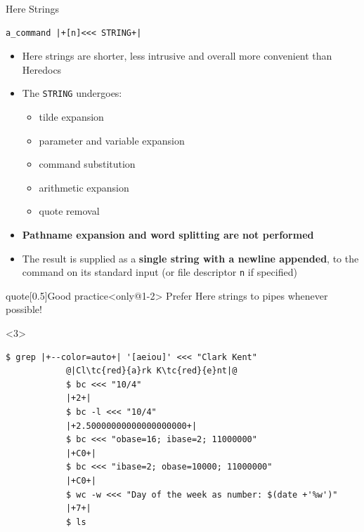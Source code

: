 \begin{frame}[fragile]{Here Strings}
    \begin{lstlisting}[style=MyBash, numbers=none]
        a_command |+[n]<<< STRING+|
    \end{lstlisting}
    \vspace{3mm}
    \begin{itemize}[<only@1-2>]
        \item Here strings are shorter, less intrusive and overall more convenient than Heredocs\\[-0.5ex]
        \item The \texttt{STRING} undergoes:
              \begin{itemize}
                  \item tilde expansion
                  \item parameter and variable expansion
                  \item command substitution
                  \item arithmetic expansion
                  \item quote removal
              \end{itemize}
        \item \textbf{Pathname expansion and word splitting are not performed}
        \item The result is supplied as a \alert{\textbf{single string with a newline appended}}, to the command on its standard input (or file descriptor \texttt{n} if specified)
    \end{itemize}
    \begin{varblock}{quote}[0.5\textwidth]{Good practice}<only@1-2>
        \textnormal{Prefer Here strings to pipes whenever possible!}
    \end{varblock}
    \begin{onlyenv}<3>
        \begin{lstlisting}[style=MyBash, aboveskip=0mm, style=oddnumbers]
            $ grep |+--color=auto+| '[aeiou]' <<< "Clark Kent"
            @|Cl\tc{red}{a}rk K\tc{red}{e}nt|@
            $ bc <<< "10/4"
            |+2+|
            $ bc -l <<< "10/4"
            |+2.50000000000000000000+|
            $ bc <<< "obase=16; ibase=2; 11000000"
            |+C0+|
            $ bc <<< "ibase=2; obase=10000; 11000000"
            |+C0+|
            $ wc -w <<< "Day of the week as number: $(date +'%w')"
            |+7+|
            $ ls

\end{lstlisting}
\end{onlyenv}
\end{frame}
